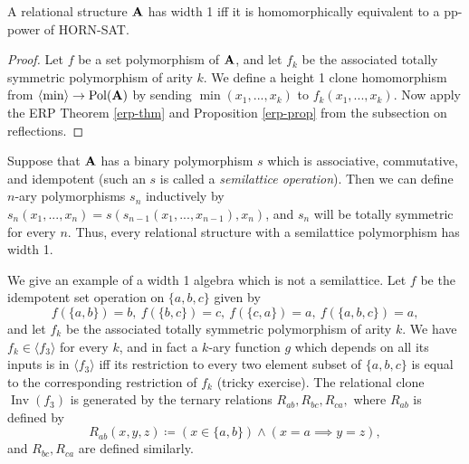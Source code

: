 \documentclass[letterpaper,11pt]{article}
\DeclareMathOperator{\Pol}{Pol}
\DeclareMathOperator{\Inv}{Inv}
\begin{document}
\begin{cor} A relational structure $\mathbf{A}$ has width 1 iff it is homomorphically equivalent to a pp-power of HORN-SAT.
\end{cor}
\begin{proof} Let $f$ be a set polymorphism of $\mathbf{A}$, and let $f_k$ be the associated totally symmetric polymorphism of arity $k$. We define a height 1 clone homomorphism from $\langle \min \rangle \rightarrow \Pol(\fA)$ by sending $\min(x_1, ..., x_k)$ to $f_k(x_1, ..., x_k)$. Now apply the ERP Theorem \ref{erp-thm} and Proposition \ref{erp-prop} from the subsection on reflections.
\end{proof}

\begin{ex} Suppose that $\mathbf{A}$ has a binary polymorphism $s$ which is associative, commutative, and idempotent (such an $s$ is called a \emph{semilattice operation}). Then we can define $n$-ary polymorphisms $s_n$ inductively by $s_n(x_1, ..., x_n) = s(s_{n-1}(x_1, ..., x_{n-1}), x_n)$, and $s_n$ will be totally symmetric for every $n$. Thus, every relational structure with a semilattice polymorphism has width 1.
\end{ex}

\begin{ex} We give an example of a width 1 algebra which is not a semilattice. Let $f$ be the idempotent set operation on $\{a,b,c\}$ given by
\[
f(\{a,b\}) = b,\ f(\{b,c\}) = c,\ f(\{c,a\}) = a,\ f(\{a,b,c\}) = a,
\]
and let $f_k$ be the associated totally symmetric polymorphism of arity $k$. We have $f_k \in \langle f_3 \rangle$ for every $k$, and in fact a $k$-ary function $g$ which depends on all its inputs is in $\langle f_3 \rangle$ iff its restriction to every two element subset of $\{a,b,c\}$ is equal to the corresponding restriction of $f_k$ (tricky exercise). The relational clone $\Inv(f_3)$ is generated by the ternary relations $R_{ab}, R_{bc}, R_{ca},$ where $R_{ab}$ is defined by
\[
R_{ab}(x,y,z) \coloneqq (x \in \{a,b\}) \wedge (x=a \implies y=z),
\]
and $R_{bc}, R_{ca}$ are defined similarly.
\end{ex}
\end{document}
